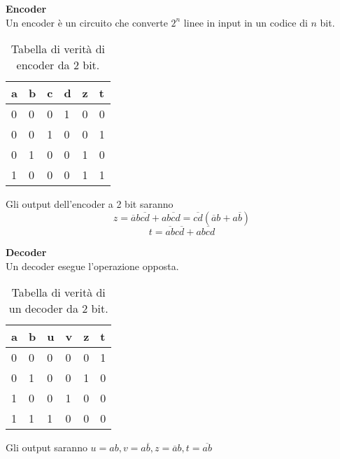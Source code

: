 \begin{defn}
	\textbf{Encoder} \\
	Un encoder è un circuito che converte $ 2^n $ linee in input in un codice di
	$ n $ bit.

	\begin{table}[H]
		\centering
		\caption{Tabella di verità di encoder da 2 bit.}
		\label{tab:2bitencoder}
		\begin{tabular}{|llll|ll|}
			\hline
			a & b & c & d & z & t \\ \hline
			0 & 0 & 0 & 1 & 0 & 0 \\
			0 & 0 & 1 & 0 & 0 & 1 \\
			0 & 1 & 0 & 0 & 1 & 0 \\
			1 & 0 & 0 & 0 & 1 & 1 \\ \hline
		\end{tabular}
	\end{table}
	
	
	Gli output dell'encoder a 2 bit saranno
	\[ z = \overbar{a}b\overbar{cd}+a\overbar{bcd} =
	\overbar{cd}(\overbar{a}b+a\overbar{b}) \]
	\[ t = \overbar{ab}c\overbar{d}+a\overbar{bcd} \]
\end{defn}

\begin{defn}
	\textbf{Decoder} \\
	Un decoder esegue l'operazione opposta.
	
	\begin{table}[H]
		\centering
		\caption{Tabella di verità di un decoder da 2 bit.}
		\label{tab:2bitdecoder}
		\begin{tabular}{|ll|llll|}
			\hline
			a & b & u & v & z & t \\ \hline
			0 & 0 & 0 & 0 & 0 & 1 \\
			0 & 1 & 0 & 0 & 1 & 0 \\
			1 & 0 & 0 & 1 & 0 & 0 \\
			1 & 1 & 1 & 0 & 0 & 0 \\ \hline
		\end{tabular}
	\end{table}
	
	Gli output saranno $ u = ab, v = a\overbar{b}, z = \overbar{a}b, t =
	\overbar{ab} $
	
\end{defn}


